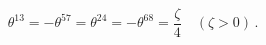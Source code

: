 \begin{equation}
  \theta^{13}=-\theta^{57}=\theta^{24}=-\theta^{68}=\frac{\zeta}{4} 
  \quad (\zeta >0)\,.
\label{eq:4.0.1}
\end{equation}

